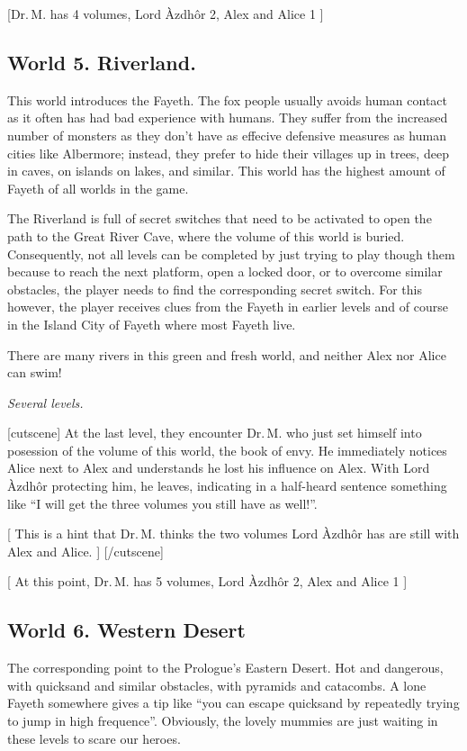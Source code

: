 \documentclass{gd-document}
\newcommand\DrM{Dr.\,M.\xspace}
\newcommand\Azdhor{Lord Àzdhôr\xspace}
\newcommand\level[1]{\textit{#1}}
\begin{document}
[\DrM has 4 volumes, \Azdhor 2, Alex and Alice 1 ]

\subsection{World 5. Riverland.}

This world introduces the Fayeth. The fox people usually avoids human
contact as it often has had bad experience with humans. They suffer
from the increased number of monsters as they don’t have as effecive
defensive measures as human cities like Albermore; instead, they
prefer to hide their villages up in trees, deep in caves, on islands
on lakes, and similar. This world has the highest amount of Fayeth of
all worlds in the game.

The Riverland is full of secret switches that need to be activated to
open the path to the Great River Cave, where the volume of this world
is buried. Consequently, not all levels can be completed by just
trying to play though them because to reach the next platform, open a
locked door, or to overcome similar obstacles, the player needs to
find the corresponding secret switch. For this however, the player
receives clues from the Fayeth in earlier levels and of course in the
Island City of Fayeth where most Fayeth live.

There are many rivers in this green and fresh world, and neither Alex
nor Alice can swim!

\level{Several levels.}

[cutscene]
At the last level, they encounter \DrM who just set himself into
posession of the volume of this world, the book of envy. He immediately notices Alice
next to Alex and understands he lost his influence on Alex. With
\Azdhor protecting him, he leaves, indicating in a half-heard sentence
something like “I will get the three volumes you still have as
well!”.

[ This is a hint that \DrM thinks the two volumes \Azdhor has are
still with Alex and Alice. ]
[/cutscene]

[ At this point, \DrM has 5 volumes, \Azdhor 2, Alex and Alice 1 ]

\subsection{World 6. Western Desert}

The corresponding point to the Prologue’s Eastern Desert. Hot and
dangerous, with quicksand and similar obstacles, with pyramids and
catacombs. A lone Fayeth somewhere gives a tip like “you can escape
quicksand by repeatedly trying to jump in high frequence”. Obviously,
the lovely mummies are just waiting in these levels to scare our
heroes.
\end{document}
